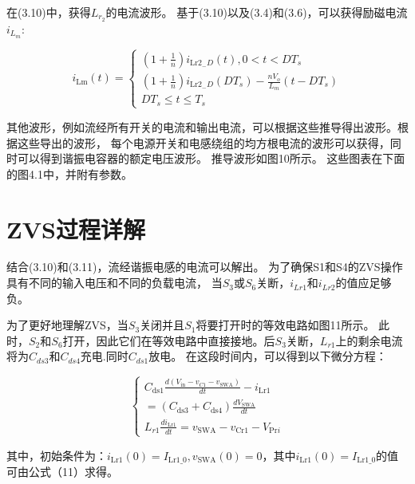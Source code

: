 \documentclass[12pt,a4paper]{report}
\begin{document}
在(3.10)中，获得$L_{r_2}$的电流波形。 基于(3.10)以及(3.4)和(3.6)，可以获得励磁电流$i_{L_m}$:

\begin{equation}
    i_{\mathrm{Lm}}(t)=\left\{\begin{array}{c}
        \left(1+\frac{1}{n}\right) i_{\mathrm{Lr} 2_{-} D}(t), 0<t<D T_{s}                                                 \\
        \left(1+\frac{1}{n}\right) i_{\mathrm{Lr} 2_{-} D}\left(D T_{s}\right)-\frac{n V_{o}}{L_{m}}\left(t-D T_{s}\right) \\
        D T_{s} \leq t \leq T_{s}
    \end{array}\right.
\end{equation}

其他波形，例如流经所有开关的电流和输出电流，可以根据这些推导得出波形。根据这些导出的波形，
每个电源开关和电感绕组的均方根电流的波形可以获得，同时可以得到谐振电容器的额定电压波形。 推导波形如图10所示。
这些图表在下面的图4.1中，并附有参数。 

\section{ZVS过程详解}

结合(3.10)和(3.11)，流经谐振电感的电流可以解出。
为了确保S1和S4的ZVS操作具有不同的输入电压和不同的负载电流，
当$S_3$或$S_6$关断，$i_{Lr1}$和$i_{Lr2}$的值应足够负。

为了更好地理解ZVS，当$S_3$关闭并且$S_1$将要打开时的等效电路如图11所示。
此时，$S_2$和$S_6$打开，因此它们在等效电路中直接接地。后$S_3$关断，$L_{r1}$上的剩余电流将为$C_{ds3}$和$C_{ds4}$充电.同时$C_{ds1}$放电。
在这段时间内，可以得到以下微分方程：

\begin{equation}
    \left\{\begin{array}{c}
        C_{\mathrm{ds} 1} \frac{d\left(V_{\mathrm{in}}-v_{C 1}-v_{\mathrm{SWA}}\right)}{d t}-i_{\mathrm{Lr} 1} \\
        =\left(C_{\mathrm{ds} 3}+C_{\mathrm{ds} 4}\right) \frac{d V_{\mathrm{SWA}}}{d t}                       \\
        L_{r 1} \frac{d i_{\mathrm{Lr} 1}}{d t}=v_{\mathrm{SWA}}-v_{\mathrm{Cr} 1}-V_{\mathrm{Pr} i}
    \end{array}\right.
\end{equation}

其中，初始条件为：$i_{\mathrm{Lr} 1}(0)=I_{\mathrm{Lr} 1\_0}, v_{\mathrm{SWA}}(0)=0$，其中$i_{\mathrm{Lr} 1}(0)=I_{\mathrm{Lr} 1\_0}$的值可由公式（11）求得。
\end{document}
